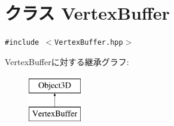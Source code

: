 \hypertarget{classm3g_1_1VertexBuffer}{
\section{クラス VertexBuffer}
\label{classm3g_1_1VertexBuffer}
}
{\tt \#include $<$VertexBuffer.hpp$>$}

VertexBufferに対する継承グラフ:\begin{figure}[H]
\begin{center}
\leavevmode
\includegraphics[height=2cm]{classm3g_1_1VertexBuffer}
\end{center}
\end{figure}
